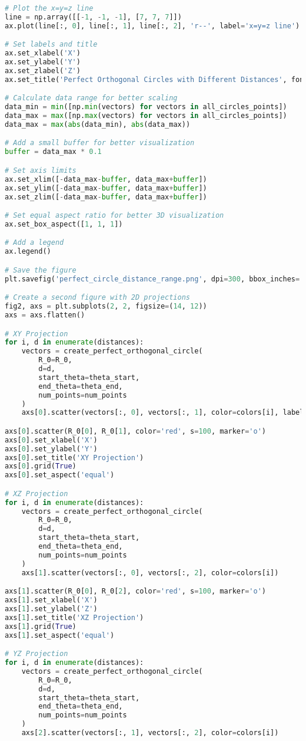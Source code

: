 \begin{lstlisting}[language=Python]
# Plot the x=y=z line
line = np.array([[-1, -1, -1], [7, 7, 7]])
ax.plot(line[:, 0], line[:, 1], line[:, 2], 'r--', label='x=y=z line')

# Set labels and title
ax.set_xlabel('X')
ax.set_ylabel('Y')
ax.set_zlabel('Z')
ax.set_title('Perfect Orthogonal Circles with Different Distances', fontsize=14)

# Calculate data range for better scaling
data_min = min([np.min(vectors) for vectors in all_circles_points])
data_max = max([np.max(vectors) for vectors in all_circles_points])
data_max = max(abs(data_min), abs(data_max))

# Add a small buffer for better visualization
buffer = data_max * 0.1

# Set axis limits
ax.set_xlim([-data_max-buffer, data_max+buffer])
ax.set_ylim([-data_max-buffer, data_max+buffer])
ax.set_zlim([-data_max-buffer, data_max+buffer])

# Set equal aspect ratio for better 3D visualization
ax.set_box_aspect([1, 1, 1])

# Add a legend
ax.legend()

# Save the figure
plt.savefig('perfect_circle_distance_range.png', dpi=300, bbox_inches='tight')

# Create a second figure with 2D projections
fig2, axs = plt.subplots(2, 2, figsize=(14, 12))
axs = axs.flatten()

# XY Projection
for i, d in enumerate(distances):
    vectors = create_perfect_orthogonal_circle(
        R_0=R_0,
        d=d,
        start_theta=theta_start,
        end_theta=theta_end,
        num_points=num_points
    )
    axs[0].scatter(vectors[:, 0], vectors[:, 1], color=colors[i], label=f'd = {d}')

axs[0].scatter(R_0[0], R_0[1], color='red', s=100, marker='o')
axs[0].set_xlabel('X')
axs[0].set_ylabel('Y')
axs[0].set_title('XY Projection')
axs[0].grid(True)
axs[0].set_aspect('equal')

# XZ Projection
for i, d in enumerate(distances):
    vectors = create_perfect_orthogonal_circle(
        R_0=R_0,
        d=d,
        start_theta=theta_start,
        end_theta=theta_end,
        num_points=num_points
    )
    axs[1].scatter(vectors[:, 0], vectors[:, 2], color=colors[i])

axs[1].scatter(R_0[0], R_0[2], color='red', s=100, marker='o')
axs[1].set_xlabel('X')
axs[1].set_ylabel('Z')
axs[1].set_title('XZ Projection')
axs[1].grid(True)
axs[1].set_aspect('equal')

# YZ Projection
for i, d in enumerate(distances):
    vectors = create_perfect_orthogonal_circle(
        R_0=R_0,
        d=d,
        start_theta=theta_start,
        end_theta=theta_end,
        num_points=num_points
    )
    axs[2].scatter(vectors[:, 1], vectors[:, 2], color=colors[i])


\end{lstlisting}
